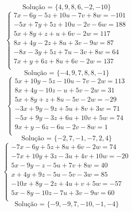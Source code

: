 \documentclass[12pt,oneside,a4paper]{article}
\begin{document}
\begin{equation*}
\text{Solução = }\{4,9,8,6,-2,-10\}
\end{equation*}
\vspace{\baselineskip}
\begin{equation*}
\begin{cases}
7x-6y-5z+10u-7v+8w=-101 \\
-5x+7y+5z+10u-2v-6w=188 \\
5x+8y+z+u+6v-2w=117 \\
8x+4y-2z+8u+3v-9w=87 \\
-8x-3y+5z+7u-3v+8w=64 \\
7x+y+6z+8u+6v-2w=137 \\
\end{cases}
\end{equation*}
\begin{equation*}
\text{Solução = }\{-4,9,7,8,8,-1\}
\end{equation*}
\vspace{\baselineskip}
\begin{equation*}
\begin{cases}
5x+10y-5z-10u-7v-2w=113 \\
8x+4y-10z-u+5v-2w=31 \\
5x+8y+z+8u-5v-2w=-29 \\
-3x+9y-9z+5u+8v+3w=71 \\
-5x+9y-3z+6u+10v+5w=74 \\
9x+y-6z-6u-2v-8w=1 \\
\end{cases}
\end{equation*}
\begin{equation*}
\text{Solução = }\{-2,7,-1,-7,2,4\}
\end{equation*}
\vspace{\baselineskip}
\begin{equation*}
\begin{cases}
-7x-6y+5z+8u+6v-2w=74 \\
-7x+10y+3z-3u+4v+10w=-20 \\
5x-9y-z-5u+7v+8w=40 \\
x+4y+9z-5u-5v-3w=85 \\
-10x+8y-2z+4u+v+5w=-57 \\
5x-8y-10z-7u+3v-9w=60 \\
\end{cases}
\end{equation*}
\begin{equation*}
\text{Solução = }\{-9,-9,7,-10,-1,-4\}
\end{equation*}
\end{document}
